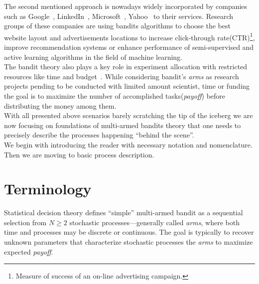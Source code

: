 \documentclass[12pt, a4paper, pdflatex, leqno]{report}
\begin{document}
The second mentioned approach is nowadays widely incorporated by companies such as Google~\citep{AYPSze12, ASMB:ASMB874}, LinkedIn~\citep{Tang:2013:AAF:2505515.2514700}, Microsoft~\citep{graepel2010web}, Yahoo~\citep{Li:2010:CAP:1772690.1772758} to their services. Research groups of these companies are using bandits algorithms to choose the best website layout and advertisements locations to increase click-through rate(CTR)\footnote{Measure of success of an on-line advertising campaign.}, improve recommendation systems or enhance performance of semi-supervised and active learning algorithms in the field of machine learning.\\

The bandit theory also plays a key role in experiment allocation with restricted resources like time and budget~\citep{gittins+glazebrook+weber}. While considering bandit's \emph{arms} as research projects pending to be conducted with limited amount scientist, time or funding the goal is to maximize the number of accomplished tasks(\emph{payoff}) before distributing the money among them.\\

With all presented above scenarios barely scratching the tip of the iceberg we are now focusing on foundations of multi-armed bandits theory that one needs to precisely describe the processes happening ``behind the scene''.\\
We begin with introducing the reader with necessary notation and nomenclature. Then we are moving to basic process description.


\section{Terminology}
Statistical decision theory defines ``simple'' multi-armed bandit as a sequential selection from $N \geq 2$ stochastic processes---generally called \emph{arms}, where both time and processes may be discrete or continuous. The goal is typically to recover unknown parameters that characterize stochastic processes the \emph{arms} to maximize expected \emph{payoff}.\\
\end{document}
